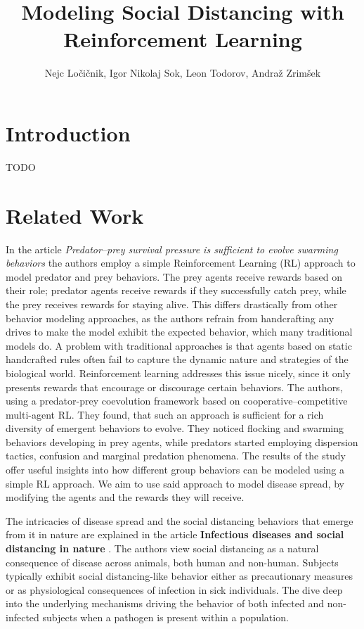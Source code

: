 \documentclass[9pt]{IEEEtran}
\title{\vspace{0ex}
Modeling Social Distancing with Reinforcement Learning}
\author{Nejc Ločičnik, Igor Nikolaj Sok, Leon Todorov, Andraž Zrimšek \vspace{-4.0ex}}
\begin{document}
\maketitle

\section{Introduction}

TODO

\section{Related Work}

In the article \textit{Predator–prey survival pressure is sufficient to evolve swarming behaviors} \cite{li2023predator} the authors employ a simple Reinforcement Learning (RL) approach to model predator and prey behaviors. The prey agents receive rewards based on their role; predator agents receive rewards if they successfully catch prey, while the prey receives rewards for staying alive. This differs drastically from other behavior modeling approaches, as the authors refrain from handcrafting any drives to make the model exhibit the expected behavior, which many traditional models do. A problem with traditional approaches is that agents based on static handcrafted rules often fail to capture the dynamic nature and strategies of the biological world. Reinforcement learning addresses this issue nicely, since it only presents rewards that encourage or discourage certain behaviors. The authors, using a predator-prey coevolution framework based on cooperative–competitive multi-agent RL. They found, that such an approach is sufficient for a rich diversity of emergent behaviors to evolve. They noticed flocking and swarming behaviors developing in prey agents, while predators started employing dispersion tactics, confusion and marginal predation phenomena. The results of the study offer useful insights into how different group behaviors can be modeled using a simple RL approach. We aim to use said approach to model disease spread, by modifying the agents and the rewards they will receive.

The intricacies of disease spread and the social distancing behaviors that emerge from it in nature are explained in the article \textbf{Infectious diseases and social distancing in nature} \cite{stockmaier2021infectious}. The authors view social distancing as a natural consequence of disease across animals, both human and non-human. Subjects typically exhibit social distancing-like behavior either as precautionary measures or as physiological consequences of infection in sick individuals. The dive deep into the underlying mechanisms driving the behavior of both infected and non-infected subjects when a pathogen is present within a population.
\end{document}
